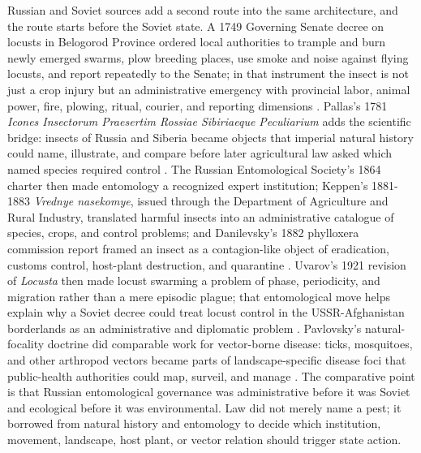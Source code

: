 \documentclass[
  english,
]{article}
\begin{document}
Russian and Soviet sources add a second route into the same
architecture, and the route starts before the Soviet state. A 1749
Governing Senate decree on locusts in Belogorod Province ordered local
authorities to trample and burn newly emerged swarms, plow breeding
places, use smoke and noise against flying locusts, and report
repeatedly to the Senate; in that instrument the insect is not just a
crop injury but an administrative emergency with provincial labor,
animal power, fire, plowing, ritual, courier, and reporting dimensions
\citep{russian_senate1749_locust_belgorod}. Pallas's 1781 \emph{Icones
Insectorum Praesertim Rossiae Sibiriaeque Peculiarium} adds the
scientific bridge: insects of Russia and Siberia became objects that
imperial natural history could name, illustrate, and compare before
later agricultural law asked which named species required control
\citep{pallas1781_icones_insectorum}. The Russian Entomological
Society's 1864 charter then made entomology a recognized expert
institution; Keppen's 1881-1883 \emph{Vrednye nasekomye}, issued through
the Department of Agriculture and Rural Industry, translated harmful
insects into an administrative catalogue of species, crops, and control
problems; and Danilevsky's 1882 phylloxera commission report framed an
insect as a contagion-like object of eradication, customs control,
host-plant destruction, and quarantine
\citep{russian_entomological_society1864_charter, keppen1881_harmful_insects, danilevsky1882_phylloxera}.
Uvarov's 1921 revision of \emph{Locusta} then made locust swarming a
problem of phase, periodicity, and migration rather than a mere episodic
plague; that entomological move helps explain why a Soviet decree could
treat locust control in the USSR-Afghanistan borderlands as an
administrative and diplomatic problem
\citep{uvarov1921_locusta_phase, snk_locust_afghanistan1934}.
Pavlovsky's natural-focality doctrine did comparable work for
vector-borne disease: ticks, mosquitoes, and other arthropod vectors
became parts of landscape-specific disease foci that public-health
authorities could map, surveil, and manage
\citep{pavlovsky1939_natural_focality, pavlovsky1946_vector_nidality}.
The comparative point is that Russian entomological governance was
administrative before it was Soviet and ecological before it was
environmental. Law did not merely name a pest; it borrowed from natural
history and entomology to decide which institution, movement, landscape,
host plant, or vector relation should trigger state action.
\end{document}

